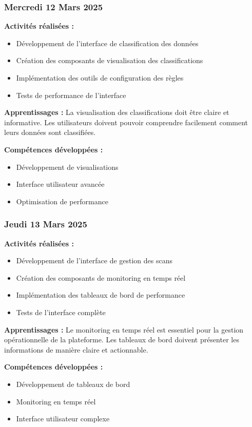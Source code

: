 \documentclass[12pt,a4paper]{article}
\begin{document}
\subsubsection{Mercredi 12 Mars 2025}
\textbf{Activités réalisées :}
\begin{itemize}
    \item Développement de l'interface de classification des données
    \item Création des composants de visualisation des classifications
    \item Implémentation des outils de configuration des règles
    \item Tests de performance de l'interface
\end{itemize}

\textbf{Apprentissages :}
La visualisation des classifications doit être claire et informative. Les utilisateurs doivent pouvoir comprendre facilement comment leurs données sont classifiées.

\textbf{Compétences développées :}
\begin{itemize}
    \item Développement de visualisations
    \item Interface utilisateur avancée
    \item Optimisation de performance
\end{itemize}

\subsubsection{Jeudi 13 Mars 2025}
\textbf{Activités réalisées :}
\begin{itemize}
    \item Développement de l'interface de gestion des scans
    \item Création des composants de monitoring en temps réel
    \item Implémentation des tableaux de bord de performance
    \item Tests de l'interface complète
\end{itemize}

\textbf{Apprentissages :}
Le monitoring en temps réel est essentiel pour la gestion opérationnelle de la plateforme. Les tableaux de bord doivent présenter les informations de manière claire et actionnable.

\textbf{Compétences développées :}
\begin{itemize}
    \item Développement de tableaux de bord
    \item Monitoring en temps réel
    \item Interface utilisateur complexe
\end{itemize}
\end{document}
